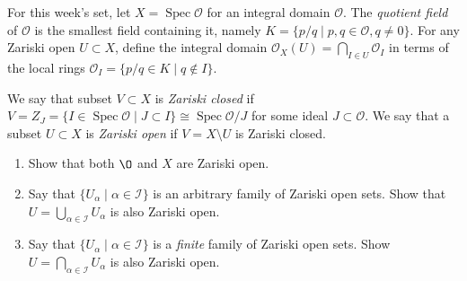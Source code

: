 \documentclass[12 pt, letterpaper]{hmcpset}
\begin{document}
For this week's set, let $X = \operatorname{Spec} \mathcal{O}$ for an integral domain $\mathcal{O}$. The \emph{quotient field} of $\mathcal{O}$ is the smallest field containing it, namely $K = \{ p/q \mid p, q \in \mathcal{O}, q \neq 0 \}$. For any Zariski open $U \subset X$, define the integral domain $\mathcal{O}_{X}(U) = \bigcap_{I \in U} \mathcal{O}_{I}$ in terms of the local rings $\mathcal{O}_{I} = \{ p / q \in K \mid q \notin I \}$.

\begin{problem}[Problem 1.]
	We say that subset $V \subset X$ is \emph{Zariski closed} if $V = Z_{J} = \{ I \in \operatorname{Spec} \mathcal{O} \mid J \subset I \} \cong \operatorname{Spec} \mathcal{O} / J$ for some ideal $J \subset \mathcal{O}$. We say that a subset $U \subset X$ is \emph{Zariski open} if $V = X \setminus U$ is Zariski closed.
	\begin{enumerate}
		\item Show that both $\O$ and $X$ are Zariski open.
		\item Say that $\{ U_{\alpha} \mid \alpha \in \mathcal{I} \}$ is an arbitrary family of Zariski open sets. Show that $U = \bigcup_{\alpha \in \mathcal{I}} U_{\alpha}$ is also Zariski open.
		\item Say that $\{ U_{\alpha} \mid \alpha \in \mathcal{I} \}$ is a \emph{finite} family of Zariski open sets. Show $U = \bigcap_{\alpha \in \mathcal{I}} U_{\alpha}$ is also Zariski open.
	\end{enumerate}
\end{problem}
\end{document}
